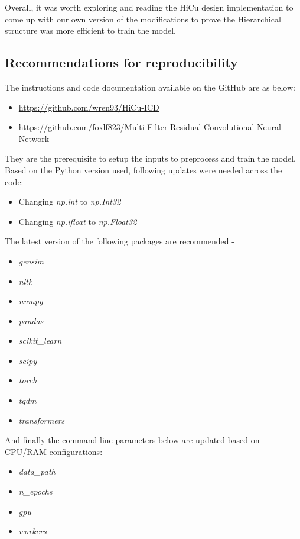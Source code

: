 \documentclass[11pt,a4paper]{article}
\begin{document}
Overall, it was worth exploring and reading the HiCu design implementation to come up with our own version of the modifications to prove the Hierarchical structure was more efficient to train the model.

\subsection{Recommendations for reproducibility}
The instructions and code documentation available on the GitHub are as below:
\begin{itemize}
\item \url{https://github.com/wren93/HiCu-ICD}
\item \url{https://github.com/foxlf823/Multi-Filter-Residual-Convolutional-Neural-Network}
\end{itemize}


They are the prerequisite to setup the inputs to preprocess and train the model. Based on the Python version used, following updates were needed across the code:

\begin{itemize}
    \item Changing \textit{np.int} to \textit{np.Int32}
    \item Changing \textit{np.ifloat} to \textit{np.Float32}
\end{itemize}

The latest version of the following packages are recommended - 
\begin{itemize}
	\item \textit{gensim}
	\item \textit{nltk}
	\item \textit{numpy}
	\item \textit{pandas}
	\item \textit{scikit\_learn}
	\item \textit{scipy}
	\item \textit{torch}
	\item \textit{tqdm}
	\item \textit{transformers}
\end{itemize}

And finally the command line parameters below are updated based on CPU/RAM configurations:
\begin{itemize}
	\item \textit{data\_path}
	\item \textit{n\_epochs}
	\item \textit{gpu}
	\item \textit{workers}
\end{itemize}
\end{document}

